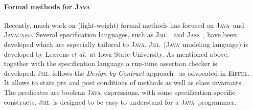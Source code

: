 \documentclass[a4paper]{llncs}
\newcommand{\jml}{\textsc{Jml}}
\newcommand{\jass}{\textsc{Jass}}
\newcommand{\java}{\textsc{Java}}
\newcommand{\cPP}{\texttt{C/C}\nolinebreak\hspace{-.05em}\raisebox{.4ex}{\tiny\bf
+}\nolinebreak\hspace{-.10em}\raisebox{.4ex}{\tiny\bf +}}
\newcommand{\eiff}{\textsc{Eiffel}}
\begin{document}
\paragraph{\bf{Formal methods for \java}}
Recently, much work on (light-weight) formal methods has focused on
\java\ and \textsc{Javacard}. Several specification languages, such as
\jml~\cite{LeavensBR00}~and \jass~\cite{bartetzko01assertions},
have been developed which are especially tailored to
\java. \jml\ (\java\ modeling language) is developed by Leavens \emph{et 
al.}~at Iowa State University. As mentioned above, together with the
specification language a run-time assertion checker is
developed. \jml\ follows the \emph{Design by Contract}
approach~\cite{Meyer97} as advocated in \eiff. It allows to state pre
and post conditions of methods as well as class invariants. The
predicates are boolean \java\ expressions, with some
specification-specific constructs. \jml\ is designed to be easy to
understand for a \java\ programmer.




\end{document}
